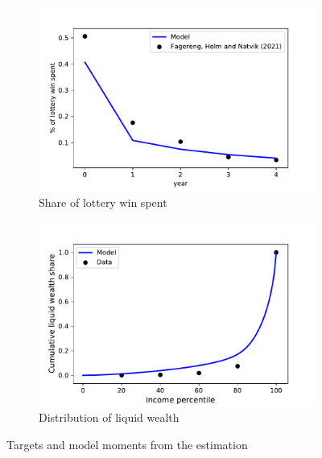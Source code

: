 \documentclass[../HAFiscal]{subfiles}
\begin{document}
\begin{figure}[htb]
\centering
\begin{subfigure}[b]{.48\linewidth}
	\centering
	\includegraphics[width=\linewidth]{../Code/HA-Models/Target_AggMPCX_LiquWealth/Figures/AggMPC_LotteryWin}
	\caption{Share of lottery win spent}
	\label{fig:aggmpclotterywin}
\end{subfigure}
\begin{subfigure}[b]{.48\linewidth}
	\centering
	\includegraphics[width=\linewidth]{../Code/HA-Models/Target_AggMPCX_LiquWealth/Figures/LiquWealth_Distribution}
	\caption{Distribution of liquid wealth}
	\label{fig:liquwealthdistribution}
\end{subfigure}%
\caption{Targets and model moments from the estimation}
\label{fig:splurge_estimation}
\end{figure}
\end{document}
